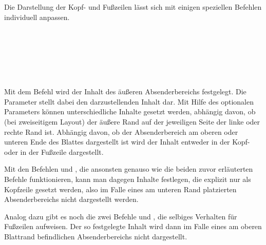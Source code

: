 Die Darstellung der Kopf- und Fußzeilen lässt sich mit einigen
speziellen Befehlen individuell anpassen.

\begin{Declaration}
  \\
  \\
  \\
  \\
  \\
\end{Declaration}

Mit dem Befehl 
wird der Inhalt des äußeren Absenderbereichs festgelegt.
Die Parameter  stellt dabei den darzustellenden Inhalt dar.
Mit Hilfe des optionalen Parameters  können unterschiedliche
Inhalte gesetzt werden, abhängig davon, ob (bei zweiseitigem Layout)
der äußere Rand auf der jeweiligen Seite der linke oder rechte Rand ist.
Abhängig davon, ob der Absenderbereich am oberen oder unteren Ende des Blattes
dargestellt ist wird der Inhalt entweder in der Kopf- oder in der Fußzeile
dargestellt.

Mit den Befehlen  und , die ansonsten genauso
wie die beiden zuvor erläuterten Befehle funktionieren, kann man dagegen
Inhalte festlegen, die explizit nur als Kopfzeile gesetzt werden, also
im Falle eines am unteren Rand platzierten Absenderbereichs nicht dargestellt 
werden.

Analog dazu gibt es noch die zwei Befehle 
und , die selbiges Verhalten für Fußzeilen aufweisen.
Der so festgelegte Inhalt wird dann im Falle eines am oberen Blattrand
befindlichen Absenderbereichs nicht dargestellt.



\begin{Declaration}
\end{Declaration}

